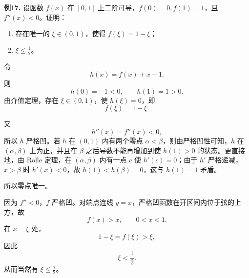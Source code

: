 \begin{problemblock}
\textbf{例17.} 设函数 \(f(x)\) 在 \([0,1]\) 上二阶可导，\(f(0)=0,f(1)=1\)，且 \(f''(x)<0\)。证明：
\begin{enumerate}[label=(\arabic*), leftmargin=2.2em]
\item 存在唯一的 \(\xi\in(0,1)\)，使得 \(f(\xi)=1-\xi\)；
\item \(\xi\le\frac12\)。
\end{enumerate}
\end{problemblock}
\begin{solutionblock}
令
\[
h(x)=f(x)+x-1.
\]
则
\[
h(0)=-1<0,\qquad h(1)=1>0.
\]
由介值定理，存在 \(\xi\in(0,1)\)，使 \(h(\xi)=0\)，即
\[
f(\xi)=1-\xi.
\]

又
\[
h''(x)=f''(x)<0,
\]
所以 \(h\) 严格凹。若 \(h\) 在 \((0,1)\) 内有两个零点 \(\alpha<\beta\)，则由严格凹性可知，\(h\) 在 \((\alpha,\beta)\) 上为正，并且在 \(\beta\) 之后导数不能再增加到使 \(h(1)>0\) 的状态。更直接地，由 Rolle 定理，在 \((\alpha,\beta)\) 内有一点 \(c\) 使 \(h'(c)=0\)；由于 \(h'\) 严格递减，\(x>\beta\) 时 \(h'(x)<0\)，故 \(h(1)<h(\beta)=0\)，这与 \(h(1)=1\) 矛盾。

所以零点唯一。

因为 \(f''<0\)，\(f\) 严格凹。对端点连线 \(y=x\)，严格凹函数在开区间内位于弦的上方，故
\[
f(x)>x,\qquad 0<x<1.
\]
在 \(x=\xi\) 处，
\[
1-\xi=f(\xi)>\xi,
\]
因此
\[
\xi<\frac12.
\]
从而当然有 \(\xi\le\frac12\)。
\end{solutionblock}

